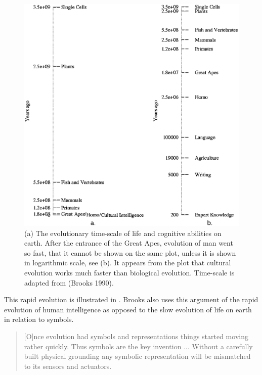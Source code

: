 \begin{figure}
\centerline{\includegraphics[width=12cm]{theory/evol.eps}}
\caption{(a) The evolutionary time-scale of life and cognitive abilities on earth. After the entrance of the Great Apes, evolution of man went so fast, that it cannot be shown on the same plot, unless it is shown in logarithmic scale, see (b). It appears from the plot that cultural evolution works much faster than biological evolution. Time-scale is adapted from (Brooks 1990).}
\label{f:theory:evolution}
\end{figure}


This rapid evolution is illustrated in . Brooks also uses this argument of the rapid evolution of human intelligence as opposed to the slow evolution of life on earth in relation to symbols.

\begin{quote}
[O]nce evolution had symbols and representations things started moving rather quickly. Thus symbols are the key invention ... Without a carefully built physical grounding any symbolic representation will be mismatched to its sensors and actuators. \citep{brooks:1990}
\end{quote}


